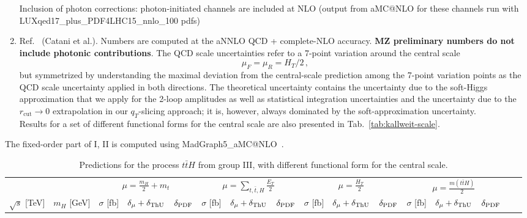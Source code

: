 \documentclass[a4paper,usenames,dvipsnames,11pt]{article}
\begin{document}
\begin{enumerate}[I:]
Inclusion of photon corrections: photon-initiated channels are included at NLO (output from aMC@NLO for these channels run with LUXqed17\_plus\_PDF4LHC15\_nnlo\_100 pdfs)
    \item Ref.~\cite{Catani:2022mfv} (Catani et al.). Numbers are computed at the aNNLO QCD + complete-NLO accuracy. {\bf MZ preliminary numbers
            do not include photonic contributions}.
             The QCD scale uncertainties refer to a 7-point variation around the central scale 
             \begin{equation}
                  \mu_F=\mu_R=H_T/2\,,
             \end{equation} 
             but symmetrized by understanding the maximal deviation from the central-scale prediction among the 7-point variation points 
             as the QCD scale uncertainty applied in both directions. The theoretical uncertainty contains the uncertainty due to the 
             soft-Higgs approximation that we apply for the 2-loop amplitudes as well as statistical integration uncertainties 
             and the uncertainty due to the $r_{\textrm{cut}}\to 0$ extrapolation in our $q_T$-slicing approach; it is, however, 
             always dominated by the soft-approximation uncertainty.\\
             Results for a set of different functional forms for the central scale are also presented in Tab.~\ref{tab:kallweit-scale}.
\end{enumerate}
The fixed-order part of I, II is computed using {\sc MadGraph5\_aMC@NLO}~\cite{Alwall:2014hca,Frederix:2018nkq}.

\begin{landscape}
\begin{table}
    \centering
    \begin{tabular}{cc|ccc|ccc|ccc|ccc|cc}
         & & \multicolumn{3}{c}{$\mu=\frac{m_H}{2}+m_t$}  & 
                                            \multicolumn{3}{c}{$\mu=\sum_{t,\bar t,H}\frac{E_T}{2}$}  &    
                                            \multicolumn{3}{c}{$\mu=\frac{H_T}{2} $} &    
                                            \multicolumn{3}{c}{$\mu=\frac{m(t\bar t H)}{2} $}\\
        $\sqrt{s}$ [TeV]  &  $m_H$ [GeV]  &
        $\sigma$ [fb] & $\delta_{\mu} + \delta_{\rm ThU}$ & $\delta_{\rm PDF}$ &
        $\sigma$ [fb] & $\delta_{\mu} + \delta_{\rm ThU}$ & $\delta_{\rm PDF}$ &
        $\sigma$ [fb] & $\delta_{\mu} + \delta_{\rm ThU}$ & $\delta_{\rm PDF}$ &
        $\sigma$ [fb] & $\delta_{\mu} + \delta_{\rm ThU}$ & $\delta_{\rm PDF}$ 
        \\
        \hline
    \end{tabular}
    \caption{\label{tab:tth} Predictions for the process $t \bar t H$ from group III, with different functional form for the central scale.}
\end{table}
\end{landscape}
\end{document}
